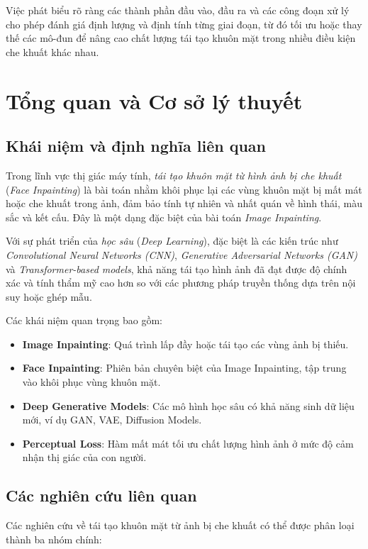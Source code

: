 \documentclass[12pt,a4paper]{article}
\begin{document}
	Việc phát biểu rõ ràng các thành phần đầu vào, đầu ra và các công đoạn xử lý cho phép đánh giá định lượng và định tính từng giai đoạn, từ đó tối ưu hoặc thay thế các mô-đun để nâng cao chất lượng tái tạo khuôn mặt trong nhiều điều kiện che khuất khác nhau.
	\section{Tổng quan và Cơ sở lý thuyết}
	
	\subsection{Khái niệm và định nghĩa liên quan}
	Trong lĩnh vực thị giác máy tính, \textit{tái tạo khuôn mặt từ hình ảnh bị che khuất} (\textit{Face Inpainting}) là bài toán nhằm khôi phục lại các vùng khuôn mặt bị mất mát hoặc che khuất trong ảnh, đảm bảo tính tự nhiên và nhất quán về hình thái, màu sắc và kết cấu. Đây là một dạng đặc biệt của bài toán \textit{Image Inpainting}.  
	
	Với sự phát triển của \textit{học sâu} (\textit{Deep Learning}), đặc biệt là các kiến trúc như \textit{Convolutional Neural Networks (CNN)}, \textit{Generative Adversarial Networks (GAN)} và \textit{Transformer-based models}, khả năng tái tạo hình ảnh đã đạt được độ chính xác và tính thẩm mỹ cao hơn so với các phương pháp truyền thống dựa trên nội suy hoặc ghép mẫu.  
	
	Các khái niệm quan trọng bao gồm:
	\begin{itemize}
		\item \textbf{Image Inpainting}: Quá trình lấp đầy hoặc tái tạo các vùng ảnh bị thiếu.
		\item \textbf{Face Inpainting}: Phiên bản chuyên biệt của Image Inpainting, tập trung vào khôi phục vùng khuôn mặt.
		\item \textbf{Deep Generative Models}: Các mô hình học sâu có khả năng sinh dữ liệu mới, ví dụ GAN, VAE, Diffusion Models.
		\item \textbf{Perceptual Loss}: Hàm mất mát tối ưu chất lượng hình ảnh ở mức độ cảm nhận thị giác của con người.
	\end{itemize}
	
	\subsection{Các nghiên cứu liên quan}
	
	Các nghiên cứu về tái tạo khuôn mặt từ ảnh bị che khuất có thể được phân loại thành ba nhóm chính:
	
\end{document}
